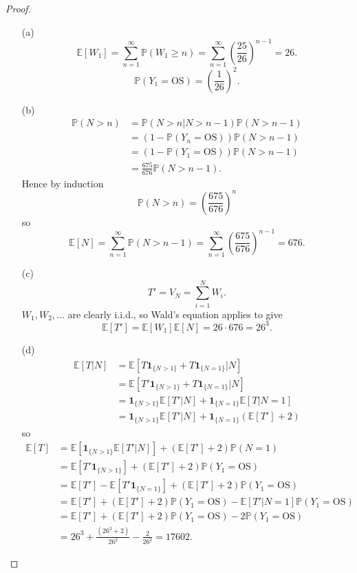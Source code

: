 \documentclass{article}
\begin{document}
\begin{proof}
\begin{enumerate}
\item[(a)] \[\mathbb{E}[W_1]=\sum_{n=1}^\infty\mathbb{P}(W_1\geq n)=\sum_{n=1}^\infty\left(\frac{25}{26}\right)^{n-1}=26.\]\[\mathbb{P}(Y_1=\text{OS})=\left(\frac{1}{26}\right)^2.\]
\item[(b)]
\begin{align*}\mathbb{P}(N> n)&=\mathbb{P}(N> n|N> n-1)\mathbb{P}(N> n-1)\\&=(1-\mathbb{P}(Y_n=\text{OS}))\mathbb{P}(N> n-1)\\&=(1-\mathbb{P}(Y_1=\text{OS}))\mathbb{P}(N>n-1)\\&=\frac{675}{676}\mathbb{P}(N>n-1).\end{align*}
Hence by induction\[\mathbb{P}(N>n)=\left(\frac{675}{676}\right)^n\]so\[\mathbb{E}[N]=\sum_{n=1}^\infty\mathbb{P}(N>n-1)=\sum_{n=1}^\infty\left(\frac{675}{676}\right)^{n-1}=676.\]
\item[(c)] \[T'=V_N=\sum_{i=1}^NW_i.\] $W_1,W_2,...$ are clearly i.i.d., so Wald's equation applies to give \[\mathbb{E}[T']=\mathbb{E}[W_1]\mathbb{E}[N]=26\cdot 676=26^3.\]
\item[(d)]
\begin{align*}
\mathbb{E}[T|N]&=\mathbb{E}[T\mathbf{1}_{\{N>1\}}+T\mathbf{1}_{\{N=1\}}|N]\\&=\mathbb{E}[T'\mathbf{1}_{\{N>1\}}+T\mathbf{1}_{\{N=1\}}|N]\\&=\mathbf{1}_{\{N>1\}}\mathbb{E}[T'|N]+\mathbf{1}_{\{N=1\}}\mathbb{E}[T|N=1]\\&=\mathbf{1}_{\{N>1\}}\mathbb{E}[T'|N]+\mathbf{1}_{\{N=1\}}(\mathbb{E}[T']+2)
\end{align*}
so\begin{align*}
\mathbb{E}[T]&=\mathbb{E}[\mathbf{1}_{\{N>1\}}\mathbb{E}[T'|N]]+(\mathbb{E}[T']+2)\mathbb{P}(N=1)\\&=\mathbb{E}[T'\mathbf{1}_{\{N>1\}}]+(\mathbb{E}[T']+2)\mathbb{P}(Y_1=\text{OS})\\&=\mathbb{E}[T']-\mathbb{E}[T'\mathbf{1}_{\{N=1\}}]+(\mathbb{E}[T']+2)\mathbb{P}(Y_1=\text{OS})\\&=\mathbb{E}[T']+(\mathbb{E}[T']+2)\mathbb{P}(Y_1=\text{OS})-\mathbb{E}[T'|N=1]\mathbb{P}(Y_1=\text{OS})\\&=\mathbb{E}[T']+(\mathbb{E}[T']+2)\mathbb{P}(Y_1=\text{OS})-2\mathbb{P}(Y_1=\text{OS})\\&=26^3+\frac{(26^3+2)}{26^2}-\frac{2}{26^2}=17602.
\end{align*}
\end{enumerate}
\end{proof}
\end{document}
